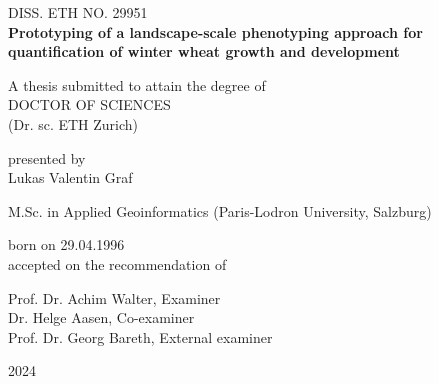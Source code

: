 \begin{titlepage}
    \begin{center}
        DISS. ETH NO. 29951\\
        \vspace{0.9cm}    
        \Huge
        \textbf{Prototyping of a landscape-scale phenotyping approach for quantification of winter wheat growth and development}
            
        \vspace{1.9cm}
        \normalsize
        A thesis submitted to attain the degree of
        \\
        \vspace{0.4cm}
        \large
        DOCTOR OF SCIENCES
        \\
        (Dr. sc. ETH Zurich)
            
        \vspace{1cm}
        presented by\\
        \vspace{0.4cm}
        \Large
        Lukas Valentin Graf
        \vspace{0.4cm}

        \normalsize
        M.Sc. in Applied Geoinformatics (Paris-Lodron University, Salzburg)\\

        \vspace{0.2cm}

        born on 29.04.1996\\
        \vspace{1.4cm}
        \normalsize
        accepted on the recommendation of\\
        \vspace{0.4cm}
        
        Prof. Dr. Achim Walter, Examiner\\
        Dr. Helge Aasen, Co-examiner\\
        Prof. Dr. Georg Bareth, External examiner\\
        \vfill

        \Large
        2024
      
     
    \end{center}
\end{titlepage}